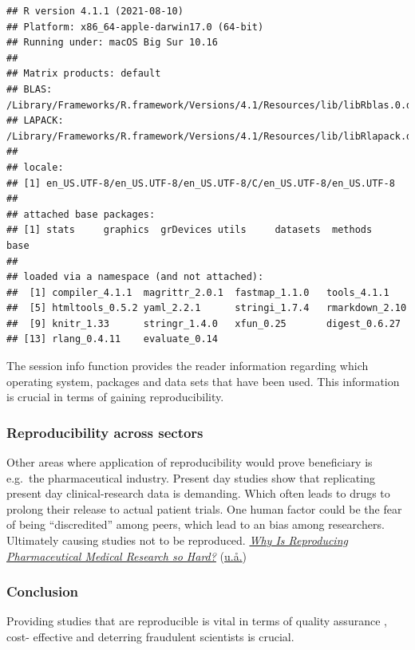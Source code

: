 \documentclass[
  12pt,
  norsk,
]{article}
\begin{document}
\begin{verbatim}
## R version 4.1.1 (2021-08-10)
## Platform: x86_64-apple-darwin17.0 (64-bit)
## Running under: macOS Big Sur 10.16
## 
## Matrix products: default
## BLAS:   /Library/Frameworks/R.framework/Versions/4.1/Resources/lib/libRblas.0.dylib
## LAPACK: /Library/Frameworks/R.framework/Versions/4.1/Resources/lib/libRlapack.dylib
## 
## locale:
## [1] en_US.UTF-8/en_US.UTF-8/en_US.UTF-8/C/en_US.UTF-8/en_US.UTF-8
## 
## attached base packages:
## [1] stats     graphics  grDevices utils     datasets  methods   base     
## 
## loaded via a namespace (and not attached):
##  [1] compiler_4.1.1  magrittr_2.0.1  fastmap_1.1.0   tools_4.1.1    
##  [5] htmltools_0.5.2 yaml_2.2.1      stringi_1.7.4   rmarkdown_2.10 
##  [9] knitr_1.33      stringr_1.4.0   xfun_0.25       digest_0.6.27  
## [13] rlang_0.4.11    evaluate_0.14
\end{verbatim}

The session info function provides the reader information regarding
which operating system, packages and data sets that have been used. This
information is crucial in terms of gaining reproducibility.

\hypertarget{reproducibility-across-sectors}{%
\subsubsection{Reproducibility across
sectors}\label{reproducibility-across-sectors}}

Other areas where application of reproducibility would prove beneficiary
is e.g.~the pharmaceutical industry. Present day studies show that
replicating present day clinical-research data is demanding. Which often
leads to drugs to prolong their release to actual patient trials. One
human factor could be the fear of being ``discredited'' among peers,
which lead to an bias among researchers. Ultimately causing studies not
to be reproduced. \protect\hyperlink{ref-Pharm-tech}{\emph{Why Is
Reproducing Pharmaceutical Medical Research so Hard?}}
(\protect\hyperlink{ref-Pharm-tech}{u.å.})

\hypertarget{conclusion}{%
\subsubsection{\texorpdfstring{\textbf{Conclusion}}{Conclusion}}\label{conclusion}}

Providing studies that are reproducible is vital in terms of quality
assurance , cost- effective and deterring fraudulent scientists is
crucial.
\end{document}
